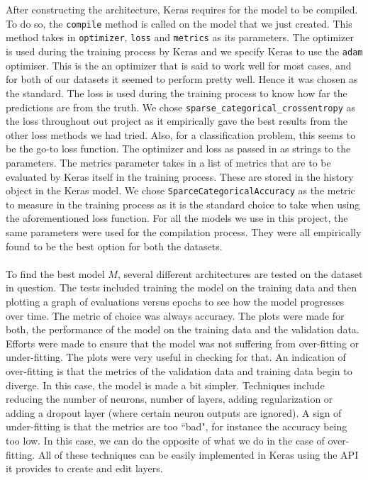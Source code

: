 \documentclass[12pt]{article}
\begin{document}
\\\\
After constructing the architecture, Keras requires for the model to be compiled. To do so, the \texttt{compile} method is called on the model that we just created. This method takes in \texttt{optimizer}, \texttt{loss} and \texttt{metrics} as its parameters. The optimizer is used during the training process by Keras and we specify Keras to use the \texttt{adam} optimiser. This is the an optimizer that is said to work well for most cases, and for both of our datasets it seemed to perform pretty well. Hence it was chosen as the standard. The loss is used during the training process to know how far the predictions are from the truth. We chose \texttt{sparse\_categorical\_crossentropy} as the loss throughout out project as it empirically gave the best results from the other loss methods we had tried. Also, for a classification problem, this seems to be the go-to loss function. The optimizer and loss as passed in as strings to the parameters. The metrics parameter takes in a list of metrics that are to be evaluated by Keras itself in the training process. These are stored in the history object in the Keras model. We chose \texttt{SparceCategoricalAccuracy} as the metric to measure in the training process as it is the standard choice to take when using the aforementioned loss function. For all the models we use in this project, the same parameters were used for the compilation process. They were all empirically found to be the best option for both the datasets. 
\\\\
To find the best model $M$, several different architectures are tested on the dataset in question. The tests included training the model on the training data and then plotting a graph of evaluations versus epochs to see how the model progresses over time. The metric of choice was always accuracy. The plots were made for both, the performance of the model on the training data and the validation data. Efforts were made to ensure that the model was not suffering from over-fitting or under-fitting. The plots were very useful in checking for that. An indication of over-fitting is that the metrics of the validation data and training data begin to diverge. In this case, the model is made a bit simpler. Techniques include reducing the number of neurons, number of layers, adding regularization or adding a dropout layer (where certain neuron outputs are ignored). A sign of under-fitting is that the metrics are too ``bad", for instance the accuracy being too low. In this case, we can do the opposite of what we do in the case of over-fitting. All of these techniques can be easily implemented in Keras using the API it provides to create and edit layers. 
\end{document}
